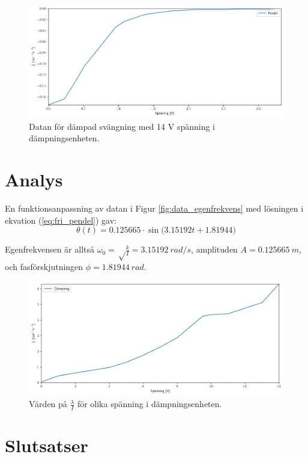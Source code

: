 \documentclass[12pt, a4paper]{article}
\begin{document}
\begin{figure}[hp]
    \includegraphics[width=\textwidth]{graf_14_v_centered}
    \caption{Datan för dämpad svängning med 14 V spänning i dämpningsenheten.}
    \label{fig:data_14_v}
\end{figure}

\clearpage
\section{Analys}

En funktionsanpassning av datan i Figur \ref{fig:data_egenfrekvens} med lösningen i ekvation (\ref{eq:fri_pendel}) gav:
\begin{equation}
    \theta(t)=0.125665\cdot\sin\bigl(3.15192t+1.81944\bigr)
\end{equation}

Egenfrekvensen är alltså $\omega_0=\sqrt\frac{k}{I}=\SI{3.15192}{rad/s}$, amplituden $A=\SI{0.125665}{m}$, och fas\-förskjutningen $\phi=\SI{1.81944}{rad}$.

\begin{figure}[hp]
    \includegraphics[width=\textwidth]{graf_voltage_damping}
    \caption{Värden på $\frac{\lambda}{I}$ för olika spänning i dämpningsenheten.}
    \label{fig:dämpning_över_spänning}
\end{figure}

\section{Slutsatser}
\end{document}
